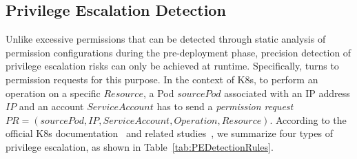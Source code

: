 \documentclass[conference]{IEEEtran}
\theoremstyle{definition}
\begin{document}

\subsection{Privilege Escalation Detection} 
\label{sec:escalation}

Unlike excessive permissions that can be detected through static analysis of permission configurations during the pre-deployment phase, precision detection of privilege escalation risks can only be achieved at runtime. Specifically, \kg turns to permission requests for this purpose. In the context of K8s, to perform an operation on a specific $Resource$, a Pod $sourcePod$ associated with an IP address $IP$ and an account $ServiceAccount$ has to send a \textit{permission request} $PR = (sourcePod, IP, ServiceAccount, Operation, Resource)
$. According to the official K8s documentation~\cite{kubernetes2024} and related studies~\cite{yang2023take,paloalto2024}, we summarize four types of privilege escalation, as shown in Table~\ref{tab:PEDetectionRules}.
\end{document}
